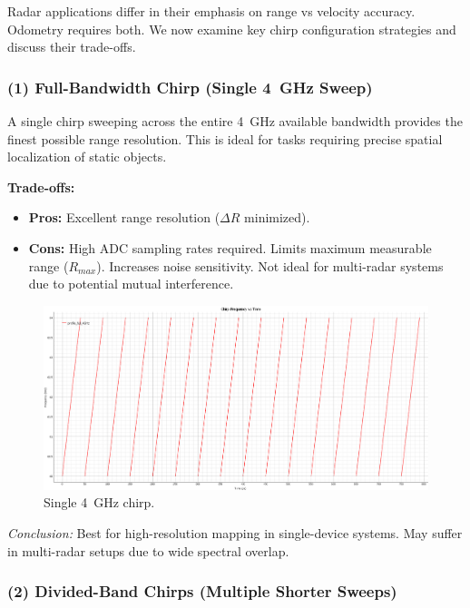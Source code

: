 Radar applications differ in their emphasis on range vs velocity accuracy.
Odometry requires both.
We now examine key chirp configuration strategies and discuss their trade-offs.
\vspace{1em}

\subsubsection*{(1) Full-Bandwidth Chirp (Single 4~GHz Sweep)}

A single chirp sweeping across the entire 4~GHz available bandwidth provides the finest possible range resolution.
This is ideal for tasks requiring precise spatial localization of static objects.

\textbf{Trade-offs:}
\begin{itemize}
    \item \textbf{Pros:} Excellent range resolution ($\Delta R$ minimized).
    \item \textbf{Cons:} High ADC sampling rates required. Limits maximum measurable range ($R_{max}$). Increases noise sensitivity. Not ideal for multi-radar systems due to potential mutual interference.
\end{itemize}

\begin{figure}[!htbp]
    \centering
    \includegraphics[width=1.0\linewidth]{images/profile_full_4GHz.png}
    \caption{Single 4~GHz chirp.}
    \label{fig:profile4GHz}
\end{figure}

{\small
\textit{Conclusion:} Best for high-resolution mapping in single-device systems.
May suffer in multi-radar setups due to wide spectral overlap.
}

\vspace{1em}

\subsubsection*{(2) Divided-Band Chirps (Multiple Shorter Sweeps)}

